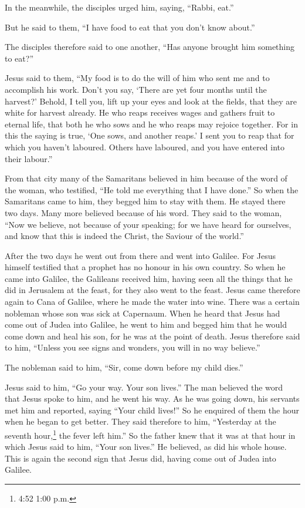 In the meanwhile, the disciples urged him, saying,
``Rabbi, eat.''

 But he said to them, ``I have food to eat that you don't
know about.''

 The disciples therefore said to one another, ``Has anyone
brought him something to eat?''

 Jesus said to them, ``My food is to do the will of him who
sent me and to accomplish his work.  Don't you say, `There
are yet four months until the harvest?' Behold, I tell you, lift up your
eyes and look at the fields, that they are white for harvest already.
 He who reaps receives wages and gathers fruit to eternal
life, that both he who sows and he who reaps may rejoice together.
 For in this the saying is true, `One sows, and another
reaps.'  I sent you to reap that for which you haven't
laboured. Others have laboured, and you have entered into their
labour.''

 From that city many of the Samaritans believed in him
because of the word of the woman, who testified, ``He told me everything
that I have done.''  So when the Samaritans came to him,
they begged him to stay with them. He stayed there two days.
 Many more believed because of his word.  They
said to the woman, ``Now we believe, not because of your speaking; for
we have heard for ourselves, and know that this is indeed the Christ,
the Saviour of the world.''

 After the two days he went out from there and went into
Galilee.  For Jesus himself testified that a prophet has no
honour in his own country.  So when he came into Galilee,
the Galileans received him, having seen all the things that he did in
Jerusalem at the feast, for they also went to the feast. 
Jesus came therefore again to Cana of Galilee, where he made the water
into wine. There was a certain nobleman whose son was sick at Capernaum.
 When he heard that Jesus had come out of Judea into
Galilee, he went to him and begged him that he would come down and heal
his son, for he was at the point of death.  Jesus therefore
said to him, ``Unless you see signs and wonders, you will in no way
believe.''

 The nobleman said to him, ``Sir, come down before my child
dies.''

 Jesus said to him, ``Go your way. Your son lives.'' The
man believed the word that Jesus spoke to him, and he went his way.
 As he was going down, his servants met him and reported,
saying ``Your child lives!''  So he enquired of them the
hour when he began to get better. They said therefore to him,
``Yesterday at the seventh hour,\footnote{4:52 1:00 p.m.} the fever left
him.''  So the father knew that it was at that hour in
which Jesus said to him, ``Your son lives.'' He believed, as did his
whole house.  This is again the second sign that Jesus did,
having come out of Judea into Galilee.

